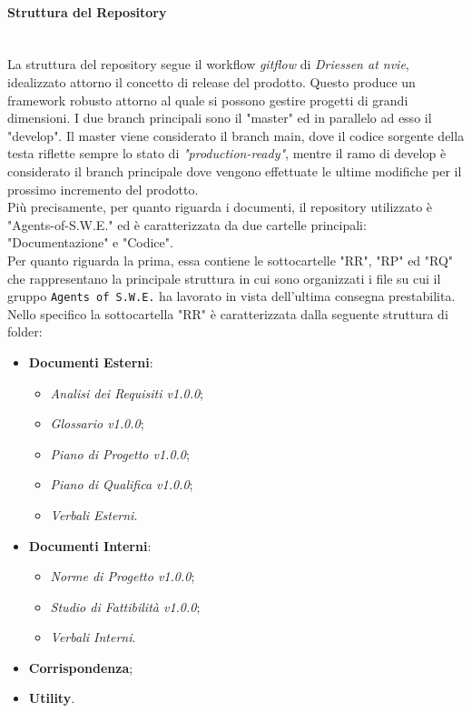 \paragraph{Struttura del Repository} \-\\ 
La struttura del repository segue il workflow \textit{gitflow} di \textit{Driessen at nvie}, idealizzato attorno il concetto di release del prodotto. Questo produce un framework robusto attorno al quale si possono gestire progetti di grandi dimensioni. I due branch principali sono il "master" ed in parallelo ad esso il "develop". 
Il master viene considerato il branch main, dove il codice sorgente della testa riflette sempre lo stato di \textit{"production-ready"},
mentre il ramo di develop è considerato il branch principale dove vengono effettuate le ultime modifiche per il prossimo incremento del prodotto.\\
Più precisamente, per quanto riguarda i documenti, il repository utilizzato è "Agents-of-S.W.E." ed è caratterizzata da due cartelle principali: "Documentazione" e "Codice".\\
Per quanto riguarda la prima, essa contiene le sottocartelle "RR", "RP" ed "RQ" che rappresentano la principale struttura in cui sono organizzati i file su cui il gruppo \texttt{Agents of S.W.E.} ha lavorato in vista dell'ultima consegna prestabilita.\\
	Nello specifico la sottocartella "RR" è caratterizzata dalla seguente struttura di folder:
	\begin{itemize}
	\item \textbf{Documenti Esterni}:
		\begin{itemize}
		\item \textit{Analisi dei Requisiti v1.0.0};
		\item \textit{Glossario v1.0.0};
		\item \textit{Piano di Progetto v1.0.0};
		\item \textit{Piano di Qualifica v1.0.0};
		\item \textit{Verbali Esterni}.
		\end{itemize}
	\item \textbf{Documenti Interni}:
		\begin{itemize}
		\item \textit{Norme di Progetto v1.0.0};
		\item \textit{Studio di Fattibilità v1.0.0};
		\item \textit{Verbali Interni}.
		\end{itemize}
	\item \textbf{Corrispondenza};
	\item \textbf{Utility}.
	\end{itemize}
